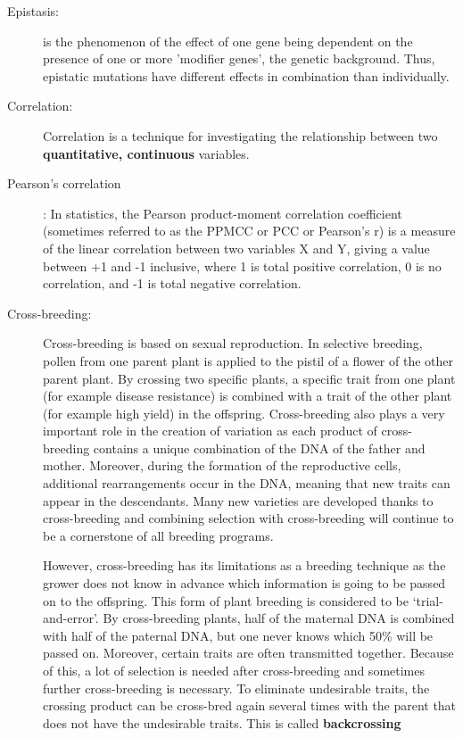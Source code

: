 \documentclass[a4paper,10pt]{article}
\begin{document}
\begin{description}
\item[Epistasis:] is the phenomenon of the effect of one gene being dependent on the presence of one or more 'modifier genes', the genetic background. 
Thus, epistatic mutations have different effects in combination than individually.

\item[Correlation:] Correlation is a technique for investigating the relationship between two \textbf{quantitative, continuous} variables.

\item [Pearson's correlation]:
In statistics, the Pearson product-moment correlation coefficient  (sometimes referred to as the PPMCC or PCC or Pearson's r) is a measure of the linear correlation between two variables X and Y, giving a value between +1 and -1 inclusive, where 1 is total positive correlation, 0 is no correlation, and -1 is total negative correlation.

\item[Cross-breeding:] Cross-breeding is based on sexual reproduction. 
In selective breeding, pollen from one parent plant is applied to the pistil of a flower of the other parent plant. 
By crossing two specific plants, a specific trait from one plant (for example disease resistance) is combined with a trait of the other plant (for example high yield) in the offspring. 
Cross-breeding also plays a very important role in the creation of variation as each product of cross-breeding contains a unique combination of the DNA of the father and mother.
Moreover, during the formation of the reproductive cells, additional rearrangements occur in the DNA, meaning that new traits can appear in the descendants.
Many new varieties are developed thanks to cross-breeding and combining selection with cross-breeding will continue to be a cornerstone of all breeding programs.

However, cross-breeding has its limitations as a breeding technique as the grower does not know in advance which information is going to be passed on to the offspring.
This form of plant breeding is considered to be ‘trial-and-error’. By cross-breeding plants, half of the maternal DNA is combined with half of the paternal DNA, but one never knows which 50\% will be passed on.
Moreover, certain traits are often transmitted together.
Because of this, a lot of selection is needed after cross-breeding and sometimes further cross-breeding is necessary.
To eliminate undesirable traits, the crossing product can be cross-bred again several times with the parent that does not have the undesirable traits. This is called \textbf{backcrossing}


\end{description}
\end{document}
